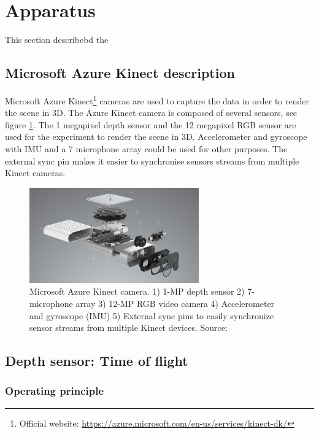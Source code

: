 \section{Apparatus}
\label{section:apparatus}
This section describebd the 

\subsection{Microsoft Azure Kinect description}

 Microsoft Azure Kinect\footnote{Official website: \url{https://azure.microsoft.com/en-us/services/kinect-dk/}} cameras are used to capture the data in order to render the scene in 3D. The Azure Kinect camera is composed of several sensors, see figure \ref{figure:kinect_sensors}. The 1 megapixel depth sensor and the 12 megapixel RGB sensor are  used for the experiment to render the scene in 3D. Accelerometer and gyroscope with IMU and a 7 microphone array could be used for other purposes. The external sync pin makes it easier to synchronise sensors streams from multiple Kinect cameras.
 
\begin{figure}[H]
    \centering
    \includegraphics[width=0.65\textwidth]{images/apparatus/kinect_sensors.jpg}
    \caption{Microsoft Azure Kinect camera. 1) 1-MP depth sensor 2) 7-microphone array 3) 12-MP RGB video camera 4) Accelerometer and gyroscope (IMU) 5) External sync pins to easily synchronize sensor streams from multiple Kinect devices. Source: \cite{noauthor_azure_nodate}}
    \label{figure:kinect_sensors}
\end{figure}

\subsection{Depth sensor: Time of flight}

\subsubsection{Operating principle}

